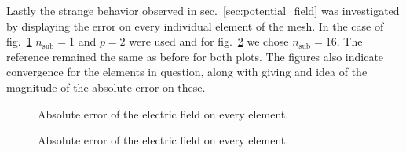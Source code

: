 Lastly the strange behavior observed in sec.~\ref{sec:potential_field} was investigated by displaying the error on every individual element of the mesh. In the case of fig.~\ref{fig:error_elem_nsub=1} $n_\mathrm{sub}=1$ and $p=2$ were used and for fig.~\ref{fig:error_elem_nsub=16} we chose $n_\mathrm{sub}=16$. The reference remained the same as before for both plots. The figures also indicate convergence for the elements in question,  along with giving and idea of the magnitude of the absolute error on these.

\begin{center}
\begin{figure}[H]
  
  \caption{Absolute error of the electric field on every element.}
  \label{fig:error_elem_nsub=1}
\end{figure}
\end{center}

\begin{center}
\begin{figure}[H]
  
  \caption{Absolute error of the electric field on every element.}
  \label{fig:error_elem_nsub=16}
\end{figure}
\end{center}
